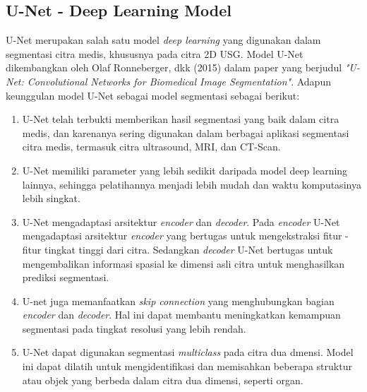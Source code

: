 \subsection{U-Net - Deep Learning Model}
U-Net merupakan salah satu model \textit{deep learning} yang digunakan dalam segmentasi citra medis, khususnya pada citra 2D USG. Model U-Net dikembangkan oleh Olaf Ronneberger, dkk (2015) \cite{ronneberger2015u} dalam paper yang berjudul \textit{"U-Net: Convolutional Networks for Biomedical Image Segmentation"}.  Adapun keunggulan model U-Net sebagai model segmentasi sebagai berikut:
\begin{enumerate}
	\item U-Net telah terbukti memberikan hasil segmentasi yang baik dalam citra medis, dan karenanya sering digunakan dalam berbagai aplikasi segmentasi citra medis, termasuk citra ultrasound, MRI, dan CT-Scan.
	\item U-Net memiliki parameter yang lebih sedikit daripada model deep learning lainnya, sehingga pelatihannya menjadi lebih mudah dan waktu komputasinya lebih singkat.
	\item U-Net mengadaptasi arsitektur \textit{encoder} dan \textit{decoder}. Pada \textit{encoder} U-Net mengadaptasi arsitektur \textit{encoder} yang bertugas untuk mengekstraksi fitur - fitur tingkat tinggi dari citra. Sedangkan \textit{decoder} U-Net bertugas untuk mengembalikan informasi spasial ke dimensi asli citra untuk menghasilkan prediksi segmentasi.
	\item U-net juga memanfaatkan \textit{skip connection} yang menghubungkan bagian \textit{encoder} dan \textit{decoder}. Hal ini dapat membantu meningkatkan kemampuan segmentasi pada tingkat resolusi yang lebih rendah.
 \item U-Net dapat digunakan segmentasi \textit{multiclass} pada citra dua dmensi. Model ini dapat dilatih untuk mengidentifikasi dan memisahkan beberapa struktur atau objek yang berbeda dalam citra dua dimensi, seperti organ.
\end{enumerate}


